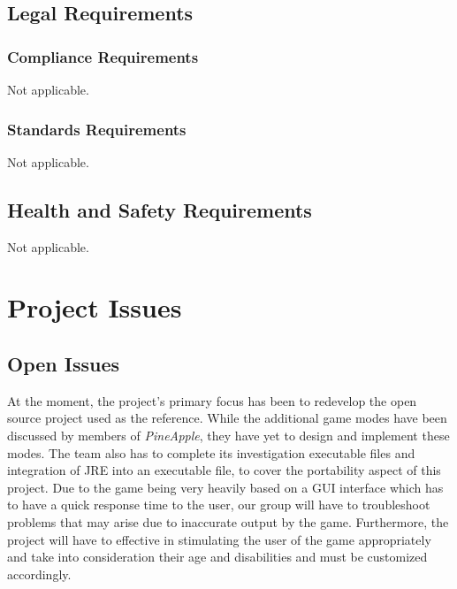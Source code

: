 \documentclass[12pt, titlepage]{article}
\begin{document}
\subsection{Legal Requirements}

\subsubsection{Compliance Requirements}
Not applicable.
\subsubsection{Standards Requirements}
Not applicable.
\subsection{Health and Safety Requirements}
Not applicable.

\newpage
\section{Project Issues}

\subsection{Open Issues}

At the moment, the project's primary focus has been to redevelop the open source project used as the reference. While the additional
game modes have been discussed by members of \textit{PineApple}, they have yet to design and implement these modes. The team
also has to complete its investigation executable files and integration of JRE into an executable file, to cover the portability aspect of this
project. Due to the game being very heavily based on a GUI interface which has to have a quick response time to the user, our group
will have to troubleshoot problems that may arise due to inaccurate output by the game. Furthermore, the project will have to effective in
stimulating the user of the game appropriately and take into consideration their age and disabilities and must be customized accordingly.
\end{document}
